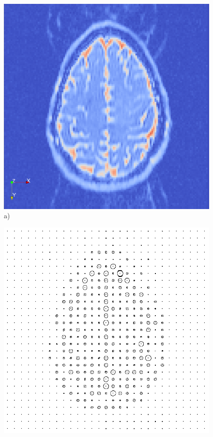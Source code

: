 \documentclass{scrartcl}
\begin{document}
\begin{figure}[!t]
\centering
  \begin{minipage}{0.23\textwidth}
  \centering
    \includegraphics[width=\textwidth]{brain_org.png}
    \label{a)}
	a)
  \end{minipage}
  \begin{minipage}{0.23\textwidth}
  \centering
    \includegraphics[width=\textwidth]{brainDwnsmpl.png}

\end{minipage}
\end{figure}
\end{document}
